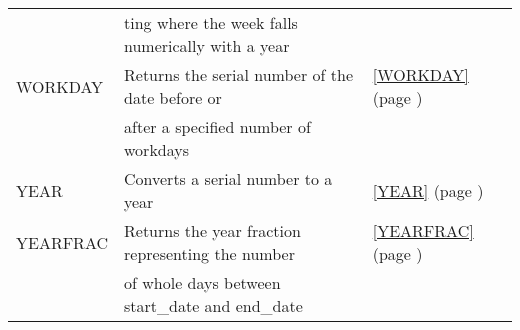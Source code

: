 \begin{center}
\begin{longtable}{l l l }
		& ting where the week falls numerically with a year &   \\
		WORKDAY & Returns the serial number of the date before or   &  \ref{WORKDAY} (page \pageref{WORKDAY}) \index{Spreadsheet Functions!WORKDAY} \\
		& after a specified number of workdays & \\
		YEAR  & Converts a serial number to a year &  \ref{YEAR} (page \pageref{YEAR}) \index{Spreadsheet Functions!YEAR} \\
		YEARFRAC & Returns the year fraction representing the number  &  \ref{YEARFRAC} (page \pageref{YEARFRAC}) \index{Spreadsheet Functions!YEARFRAC} \\
		& of whole days between start\_date and end\_date &   \\
	\end{longtable}
\end{center}




